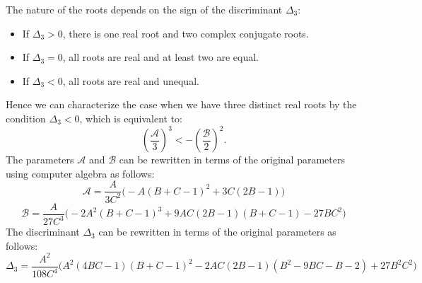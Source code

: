 \documentclass[a4paper, 12pt]{article}
\begin{document}
The nature of the roots depends on the sign of the discriminant $\Delta_3$:
\begin{itemize}
\item If $\Delta_3 > 0$, there is one real root and two complex conjugate roots.
\item If $\Delta_3 = 0$, all roots are real and at least two are equal.
\item If $\Delta_3 < 0$, all roots are real and unequal.
\end{itemize}
Hence we can characterize the case when we have three distinct real roots by the condition $\Delta_3 < 0$, which is equivalent to:
\[ {\left(\frac{\mathcal{A}}{3}\right)}^3 < - {\left(\frac{\mathcal{B}}{2}\right)}^2.
\]
The parameters $\mathcal{A}$ and $\mathcal{B}$ can be rewritten in terms of the original parameters  using computer algebra as follows:
\[
\mathcal{A}=\frac{A}{ 3 C^2} \Big(-A {(B + C - 1)}^2 + 3 C(2B - 1)\Big)
\]
\[
\mathcal{B}= \frac{A}{27 C^3} \Big(-2A^2 {(B + C - 1)}^3 + 9 A C (2 B - 1)(B + C - 1) - 27 B C^2\Big)
\]
The discriminant $\Delta_3$ can be rewritten in terms of the original parameters as follows:
\[
\Delta_3 = \frac{A^2}{108 C^4} \Bigg(A^2 (4BC-1) {(B + C - 1)}^2 - 2AC (2B-1)(B^2-9BC-B-2) + 27 B^2 C^2\Bigg)
\]
\par\noindent
\end{document}
